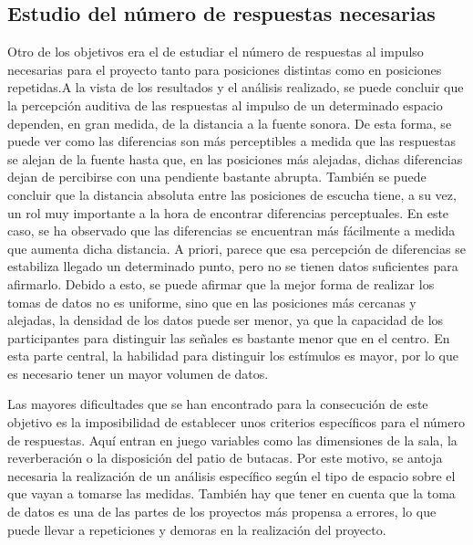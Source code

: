\documentclass[11pt,a4paper,twoside]{book}
\begin{document}
        \subsection*{Estudio del número de respuestas necesarias}
            Otro de los objetivos era el de estudiar el número de respuestas al impulso necesarias para el proyecto tanto para posiciones distintas como en posiciones repetidas.A la vista de los resultados y el análisis realizado, se puede concluir que la percepción auditiva de las respuestas al impulso de un determinado espacio dependen, en gran medida, de la distancia a la fuente sonora. De esta forma, se puede ver como las diferencias son más perceptibles a medida que las respuestas se alejan de la fuente hasta que, en las posiciones más alejadas, dichas diferencias dejan de percibirse con una pendiente bastante abrupta. También se puede concluir que la distancia absoluta entre las posiciones de escucha tiene, a su vez, un rol muy importante a la hora de encontrar diferencias perceptuales. En este caso, se ha observado que las diferencias se encuentran más fácilmente a medida que aumenta dicha distancia. A priori, parece que esa percepción de diferencias se estabiliza llegado un determinado punto, pero no se tienen datos suficientes para afirmarlo. Debido a esto, se puede afirmar que la mejor forma de realizar los tomas de datos no es uniforme, sino que en las posiciones más cercanas y alejadas, la densidad de los datos puede ser menor, ya que la capacidad de los participantes para distinguir las señales es bastante menor que en el centro. En esta parte central, la habilidad para distinguir los estímulos es mayor, por lo que es necesario tener un mayor volumen de datos. 
    
            Las mayores dificultades que se han encontrado para la consecución de este objetivo es la imposibilidad de establecer unos criterios específicos para el número de respuestas. Aquí entran en juego variables como las dimensiones de la sala, la reverberación o la disposición del patio de butacas. Por este motivo, se antoja necesaria la realización de un análisis específico según el tipo de espacio sobre el que vayan a tomarse las medidas. También hay que tener en cuenta que la toma de datos es una de las partes de los proyectos más propensa a errores, lo que puede llevar a repeticiones y demoras en la realización del proyecto.
        
\end{document}
